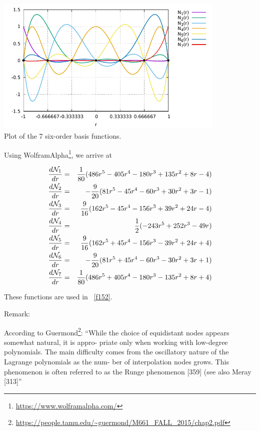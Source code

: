 \begin{center}
\includegraphics[width=11cm]{images/basis1D/Q6.pdf}\\
{\captionfont Plot of the 7 six-order basis functions.}
\end{center}

Using WolframAlpha\footnote{\url{https://www.wolframalpha.com/}}, we arrive at 

\begin{eqnarray}
\frac{d {\mathcal{N}}_1}{dr} &=& \frac{1}{80} (486r^5 - 405r^4 - 180r^3 + 135 r^2 +8r-4) \nonumber\\
\frac{d {\mathcal{N}}_2}{dr} &=& -\frac{9}{20} (81r^5 - 45r^4 -60r^3 + 30r^2 +3r -1) \nonumber\\ 
\frac{d {\mathcal{N}}_3}{dr} &=& \frac{9}{16} (162r^5-45r^4 -156r^3 +39r^2 +24r -4) \nonumber\\ 
\frac{d {\mathcal{N}}_4}{dr} &=& \frac{1}{2} (-243r^5+252r^3-49r) \nonumber\\
\frac{d {\mathcal{N}}_5}{dr} &=& \frac{9}{16} (162r^5 +45r^4 -156r^3 -39r^2 +24r +4) \nonumber\\ 
\frac{d {\mathcal{N}}_6}{dr} &=& -\frac{9}{20} (81r^5 +45r^4 -60r^3 - 30r^2 +3r +1) \nonumber\\ 
\frac{d {\mathcal{N}}_7}{dr} &=& \frac{1}{80} (486r^5 + 405r^4 - 180r^3 -135r^2 +8r+4) 
\end{eqnarray}

These functions are used in \stone~\ref{f152}.

\newpage

Remark:

According to Guermond\footnote{\url{https://people.tamu.edu/~guermond/M661_FALL_2015/chap2.pdf}}:
``While the choice of equidistant nodes appears somewhat natural, it is appro-
priate only when working with low-degree polynomials. The main diﬃculty
comes from the oscillatory nature of the Lagrange polynomials as the num-
ber of interpolation nodes grows. This phenomenon is often referred to as the
Runge phenomenon [359] (see also Meray [313]''





